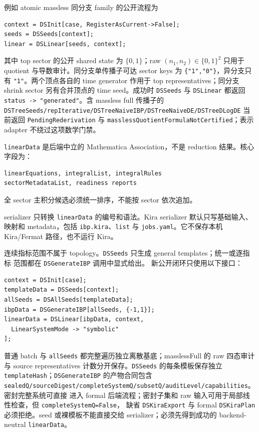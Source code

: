 ﻿\documentclass[a4paper,11pt]{article}
\begin{document}
例如 atomic massless 同分支 family 的公开流程为
\begin{verbatim}
context = DSInit[case, RegisterAsCurrent->False];
seeds = DSSeeds[context];
linear = DSLinear[seeds, context];
\end{verbatim}
其中 top sector 的公开 shared state 为 $\{0,1\}$；raw $(n_1,n_2)\in\{0,1\}^2$ 只用于 quotient 与导数审计。同分支单传播子可达 sector keys 为 \texttt{\{"1","0"\}}，异分支只有 \texttt{"1"}。两个顶点各自的 time generator 作用于 top representatives；同分支 shrink sector 另有合并顶点的 time seed。成功时 \texttt{DSSeeds} 与 \texttt{DSLinear} 都返回 \texttt{status -> "generated"}。含 massless full 传播子的 \texttt{DSTreeSeeds/repIterative/DSTreeNaiveIBP/DSTreeNaiveDE/DSTreeDLogDE} 当前返回 \texttt{PendingRederivation} 与 \texttt{masslessQuotientFormulaNotCertified}；表示 adapter 不绕过这项数学门禁。

\texttt{linearData} 是后端中立的 Mathematica Association，不是 reduction 结果。核心字段为：
\begin{verbatim}
linearEquations, integralList, integralRules
sectorMetadataList, readiness reports
\end{verbatim}
全 sector 主积分候选必须统一排序，不能按 sector 依次追加。

serializer 只转换 \texttt{linearData} 的编号和语法。Kira serializer 默认只写基础输入、映射和 metadata，包括 \texttt{ibp.kira}、\texttt{list} 与 \texttt{jobs.yaml}。它不保存本机 Kira/Fermat 路径，也不运行 Kira。

连续指标范围不属于 topology。\texttt{DSSeeds} 只生成 general templates；统一或逐指标
范围都在 \texttt{DSGenerateIBP} 调用中显式给出。
新公开闭环只使用以下接口：
\begin{verbatim}
context = DSInit[case];
templateData = DSSeeds[context];
allSeeds = DSAllSeeds[templateData];
ibpData = DSGenerateIBP[allSeeds, {-1,1}];
linearData = DSLinear[ibpData, context,
  LinearSystemMode -> "symbolic"
];
\end{verbatim}
普通 batch 与 \texttt{allSeeds} 都完整遍历独立离散基底；masslessFull 的 raw 四态审计与 source representatives 计数分开保存。\texttt{DSSeeds} 的每条模板保存独立
\texttt{templateHash}；\texttt{DSGenerateIBP} 的产物合同包含
\texttt{sealedQ/sourceDigest/completeSystemQ/subsetQ/auditLevel/capabilities}。密封完整系统可直接
进入 formal 后端流程；密封子集和 raw 输入可用于局部线性检查，但 \texttt{completeSystemQ=False}，
缺省 \texttt{DSKiraExport} 与 formal \texttt{DSKiraPlan} 必须拒绝。seed 或裸模板不能直接交给
serializer；必须先得到成功的 backend-neutral \texttt{linearData}。
\end{document}
